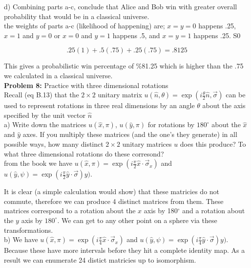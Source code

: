 d) Combining parts a-c, conclude that Alice and Bob win with greater overall
probability that would be in a classical universe.\\

the weights of parts a-c (likelihood of happening) are; $x=y=0$ happens .25,
$x=1$ and $y=0$ or $x=0$ and $y=1$ happens .5, and $x=y=1$ happens .25. S0

$$.25(1)+.5(.75)+.25(.75)=.8125$$

This gives a probabilistic win percentage of \%81.25 which is higher than the
.75 we calculated in a classical universe.\\


\textbf{Problem 8:} Practice with three dimensional rotations\\

Recall (eq B.13) that the $2\times2$ unitary matrix $u(\hat
n,\theta)=\exp(i\frac{\theta}{2}\hat n,\vec\sigma)$ can be used to represent
rotations in three real dimensions by an angle $\theta$ about the axis
specified by the unit vector $\hat n$\\

a) Write down the matrices $u(\hat x,\pi)$, $u(\hat y,\pi)$ for rotations by
$180^\circ$ about the $\hat x$ and $\hat y$ axes. If you multiply these
matrices (and the one's they generate) in all possible ways, how many distinct
$2\times 2$ unitary matrices $u$ does this produce? To what three dimensional
rotations do these corresond?\\

from the book we have $u(\hat x,\pi)=\exp(i\frac{\pi}{2}\hat x\cdot\vec\sigma_x)$ and $u(\hat y,\psi)=\exp(i\frac{\pi}{2}\hat y\cdot\vec\sigma)y)$.

It is clear (a simple calculation would show) that these matricies do not
commute, therefore we can produce 4 distinct matrices from them. These
matrices correspond to a rotation about the $x$ axis by 180$^\circ$ and a
rotation about the $y$ axis by $180^\circ$. We can get to any other point on a
sphere via these transformations.\\

b) We have $u(\hat x,\pi)=\exp(i\frac{\pi}{4}\hat x\cdot\vec\sigma_x)$ and $u(\hat y,\psi)=\exp(i\frac{\pi}{4}\hat y\cdot\vec\sigma)y)$. Because these have more intervals before they hit a complete identity map. As a result we can enumerate 24 distict matricies up to isomorphism.\\















